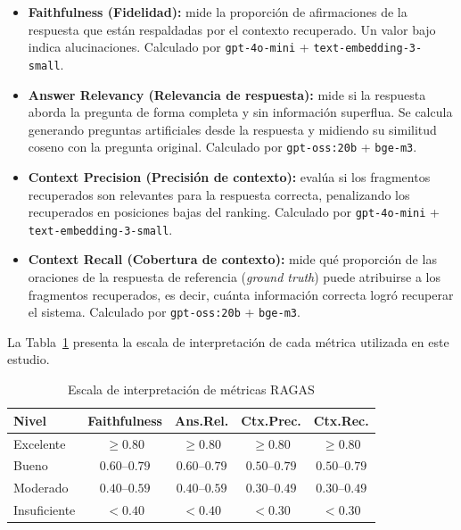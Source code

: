 \documentclass{article}
\begin{document}
\begin{itemize}
\item \textbf{Faithfulness (Fidelidad):} mide la proporción de afirmaciones de
  la respuesta que están respaldadas por el contexto recuperado. Un valor bajo
  indica alucinaciones. Calculado por \texttt{gpt-4o-mini} + \texttt{text-embedding-3-small}.

\item \textbf{Answer Relevancy (Relevancia de respuesta):} mide si la
  respuesta aborda la pregunta de forma completa y sin información superflua.
  Se calcula generando preguntas artificiales desde la respuesta y midiendo su
  similitud coseno con la pregunta original. Calculado por \texttt{gpt-oss:20b}
  + \texttt{bge-m3}.

\item \textbf{Context Precision (Precisión de contexto):} evalúa si los
  fragmentos recuperados son relevantes para la respuesta correcta, penalizando
  los recuperados en posiciones bajas del ranking. Calculado por
  \texttt{gpt-4o-mini} + \texttt{text-embedding-3-small}.

\item \textbf{Context Recall (Cobertura de contexto):} mide qué proporción de
  las oraciones de la respuesta de referencia (\textit{ground truth}) puede
  atribuirse a los fragmentos recuperados, es decir, cuánta información
  correcta logró recuperar el sistema. Calculado por \texttt{gpt-oss:20b} + \texttt{bge-m3}.
\end{itemize}

La Tabla~\ref{tab:escalas} presenta la escala de interpretación de cada métrica
utilizada en este estudio.

\begin{table}[H]
\centering
\small
\begin{tabular}{|l|c|c|c|c|}
\hline
\textbf{Nivel} & \textbf{Faithfulness} & \textbf{Ans.Rel.} & \textbf{Ctx.Prec.} & \textbf{Ctx.Rec.} \\
\hline
Excelente  & $\geq 0.80$ & $\geq 0.80$ & $\geq 0.80$ & $\geq 0.80$ \\
Bueno      & $0.60$--$0.79$ & $0.60$--$0.79$ & $0.50$--$0.79$ & $0.50$--$0.79$ \\
Moderado   & $0.40$--$0.59$ & $0.40$--$0.59$ & $0.30$--$0.49$ & $0.30$--$0.49$ \\
Insuficiente & $< 0.40$ & $< 0.40$ & $< 0.30$ & $< 0.30$ \\
\hline
\end{tabular}
\caption{Escala de interpretación de métricas RAGAS}
\label{tab:escalas}
\end{table}
\end{document}
